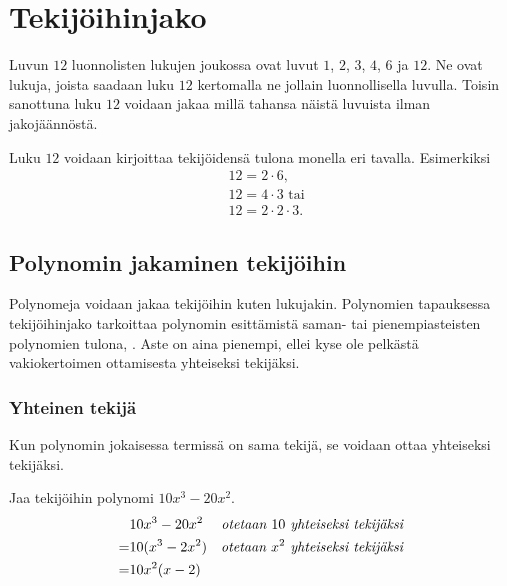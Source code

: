 \section{Tekijöihinjako}


Luvun $12$  luonnolisten lukujen joukossa ovat luvut $1$, $2$, $3$, $4$, $6$ ja $12$. Ne ovat lukuja, joista saadaan luku $12$ kertomalla ne jollain luonnollisella luvulla. Toisin sanottuna luku $12$ voidaan jakaa millä tahansa näistä luvuista ilman jakojäännöstä.

\begin{esimerkki}
Luku $12$ voidaan kirjoittaa tekijöidensä tulona monella eri tavalla. Esimerkiksi
\begin{align*}
&12 = 2 \cdot 6, \\
&12= 4 \cdot 3 \text{ tai} \\
&12= 2 \cdot 2 \cdot 3.
\end{align*}
\end{esimerkki}

\subsection{Polynomin jakaminen tekijöihin}


Polynomeja voidaan jakaa tekijöihin kuten lukujakin. Polynomien tapauksessa tekijöihinjako tarkoittaa polynomin esittämistä saman- tai pienempiasteisten polynomien tulona, . Aste on aina pienempi, ellei kyse ole pelkästä vakiokertoimen ottamisesta yhteiseksi tekijäksi.

\subsubsection*{Yhteinen tekijä}

Kun polynomin jokaisessa termissä on sama tekijä, se voidaan ottaa yhteiseksi tekijäksi.

\begin{esimerkki}
Jaa tekijöihin polynomi $10x^3-20x^2$.
\begin{align*}
& 10x^3-20x^2 &\emph{otetaan $10$ yhteiseksi tekijäksi}\\
=& 10(x^3-2x^2) &\emph{otetaan $x^2$ yhteiseksi tekijäksi} \\
=& 10x^2(x-2)  
\end{align*}
\end{esimerkki}

